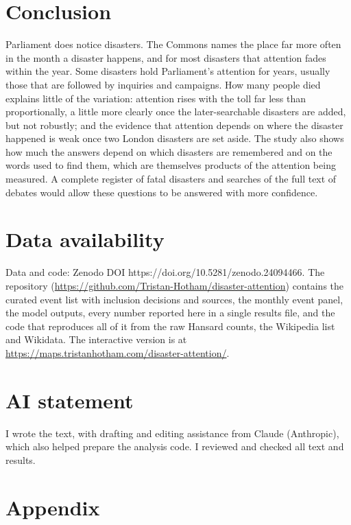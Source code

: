 \documentclass[11pt,a4paper]{article}
\begin{document}
\section{Conclusion}
\label{sec:conclusion}
Parliament does notice disasters. The Commons names the place far more often in the month a disaster happens, and for most disasters that attention fades within the year. Some disasters hold Parliament's attention for years, usually those that are followed by inquiries and campaigns. How many people died explains little of the variation: attention rises with the toll far less than proportionally, a little more clearly once the later-searchable disasters are added, but not robustly; and the evidence that attention depends on where the disaster happened is weak once two London disasters are set aside. The study also shows how much the answers depend on which disasters are remembered and on the words used to find them, which are themselves products of the attention being measured. A complete register of fatal disasters and searches of the full text of debates would allow these questions to be answered with more confidence.

\section*{Data availability}
Data and code: Zenodo DOI https://doi.org/10.5281/zenodo.24094466. The repository (\url{https://github.com/Tristan-Hotham/disaster-attention}) contains the curated event list with inclusion decisions and sources, the monthly event panel, the model outputs, every number reported here in a single results file, and the code that reproduces all of it from the raw Hansard counts, the Wikipedia list and Wikidata. The interactive version is at \url{https://maps.tristanhotham.com/disaster-attention/}.

\section*{AI statement}
I wrote the text, with drafting and editing assistance from Claude (Anthropic), which also helped prepare the analysis code. I reviewed and checked all text and results.




\appendix
\section{Appendix}
\label{sec:appendix}
\end{document}
